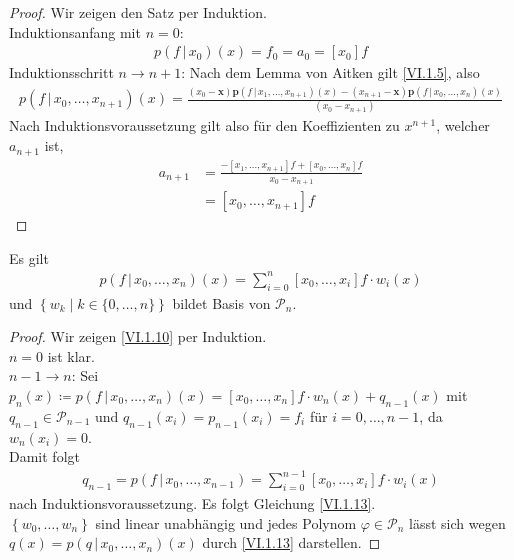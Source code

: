 \begin{proof}
  Wir zeigen den Satz per Induktion.\\
  Induktionsanfang mit $n=0$:
  \begin{gather*}
    p(f\,|\,x_0) (x) = f_0 = a_0 = [x_0]f
  \end{gather*}
  Induktionsschritt $n \rightarrow n+1$:
  Nach dem Lemma von Aitken gilt \eqref{VI.1.5}, also 
  \begin{gather*}
    p(f\,|\,x_0, \dots, x_{n+1}) (x) 
    = \frac{(x_0-{\boldsymbol x}){\boldsymbol p}(f\,|\,x_1,\dots, x_{n+1})(x) -
      (x_{n+1}-{\boldsymbol x}){\boldsymbol p}(f\,|\,x_0,\dots, x_{n})(x)}
    {(x_0-x_{n+1})}
  \end{gather*}
  Nach Induktionsvoraussetzung gilt also 
  für den Koeffizienten zu  $x^{n+1}$, welcher $a_{n+1}$ ist,
  \begin{align*}
    a_{n+1} &= \frac{-[x_1,\dots, x_{n+1}]f+[x_0,\dots,x_n]f}
              {x_0-x_{n+1}}\\
            & = [x_0, \dots , x_{n+1}] f
  \end{align*}
\end{proof}


\begin{Satze}\label{6.1.7}
  Es gilt 
  \begin{gather}
    p(f\,|\, x_0, \dots , x_n)(x) 
    = \sum_{i=0}^{n}[x_0,\dots, x_i]f\cdot w_i(x)
    \label{VI.1.13}
  \end{gather}
  und $\left\{w_k\middle\vert k\in \{0,\dots,n\}\right\}$
  bildet Basis von $\mathcal{P}_n$.
\end{Satze}

\begin{proof}
  Wir zeigen \eqref{VI.1.10} per Induktion.\\
  $n=0$ ist klar.\\
  $n-1\rightarrow n$: Sei $p_n(x)\coloneqq p(f\,|\, x_0,\dots,x_n)(x)
  = [x_0,\dots, x_n]f \cdot w_n(x) + q_{n-1}(x)$ mit
  $q_{n-1}\in\mathcal{P}_{n-1}$ und $q_{n-1}(x_i)=p_{n-1}(x_i)=f_i$
  für $i=0,\dots ,n-1$, da $w_n(x_i)=0$.\\
  Damit folgt
  \begin{gather*}
    q_{n-1} = p(f\,|\,x_0, \dots, x_{n-1})
    =\sum_{i=0}^{n-1}[x_0,\dots, x_i]f\cdot w_i(x)
  \end{gather*}
  nach Induktionsvoraussetzung. 
  Es folgt Gleichung  \eqref{VI.1.13}.\\
  $\left\{w_0, \dots,w_n\right\}$ sind linear unabhängig
  und jedes Polynom $\varphi\in\mathcal{P}_n$
  lässt sich wegen $q(x)=p(q\,|\,x_0,\dots,x_n)(x)$
  durch \eqref{VI.1.13} darstellen.
\end{proof}

